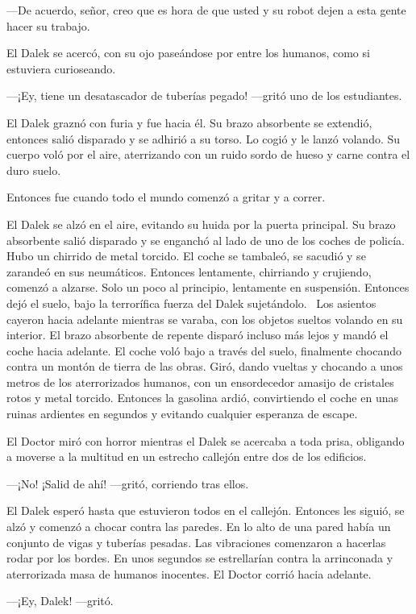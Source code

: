 ---De acuerdo, señor, creo que es hora de que usted y su robot dejen a
esta gente hacer su trabajo.

El Dalek se acercó, con su ojo paseándose por entre los humanos, como si
estuviera curioseando.

---¡Ey, tiene un desatascador de tuberías pegado! ---gritó uno de los
estudiantes.

El Dalek graznó con furia y fue hacia él. Su brazo absorbente se
extendió, entonces salió disparado y se adhirió a su torso. Lo cogió y
le lanzó volando. Su cuerpo voló por el aire, aterrizando con un ruido
sordo de hueso y carne contra el duro suelo.

Entonces fue cuando todo el mundo comenzó a gritar y a correr.

El Dalek se alzó en el aire, evitando su huida por la puerta principal.
Su brazo absorbente salió disparado y se enganchó al lado de uno de los
coches de policía. Hubo un chirrido de metal torcido. El coche se
tambaleó, se sacudió y se zarandeó en sus neumáticos. Entonces
lentamente, chirriando y crujiendo, comenzó a alzarse. Solo un poco al
principio, lentamente en suspensión. Entonces dejó el suelo, bajo la
terrorífica fuerza del Dalek sujetándolo. ~Los asientos cayeron hacia
adelante mientras se varaba, con los objetos sueltos volando en su
interior. El brazo absorbente de repente disparó incluso más lejos y
mandó el coche hacia adelante. El coche voló bajo a través del suelo,
finalmente chocando contra un montón de tierra de las obras. Giró, dando
vueltas y chocando a unos metros de los aterrorizados humanos, con un
ensordecedor amasijo de cristales rotos y metal torcido. Entonces la
gasolina ardió, convirtiendo el coche en unas ruinas ardientes en
segundos y evitando cualquier esperanza de escape.

El Doctor miró con horror mientras el Dalek se acercaba a toda prisa,
obligando a moverse a la multitud en un estrecho callejón entre dos de
los edificios.

---¡No! ¡Salid de ahí! ---gritó, corriendo tras ellos.

El Dalek esperó hasta que estuvieron todos en el callejón. Entonces les
siguió, se alzó y comenzó a chocar contra las paredes. En lo alto de una
pared había un conjunto de vigas y tuberías pesadas. Las vibraciones
comenzaron a hacerlas rodar por los bordes. En unos segundos se
estrellarían contra la arrinconada y aterrorizada masa de humanos
inocentes. El Doctor corrió hacia adelante.

---¡Ey, Dalek! ---gritó.

